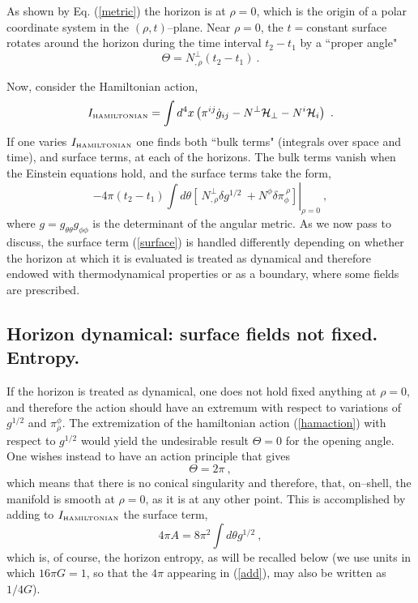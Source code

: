 \documentclass[a4paper,preprintnumbers,amsmath,amssymb]{revtex4}
\begin{document}
As shown by Eq. (\ref{metric}) the horizon is at $\rho=0$, which is the origin
of a polar coordinate system in the $(\rho,t)$--plane. Near $\rho=0$, the $t=$constant surface rotates around the horizon during the time interval $t_2-t_1$ by a
``proper angle"
\begin{equation}
\Theta= N^{\perp}_{,\rho} (t_2-t_1) \ .
\label{angle}
\end{equation}

Now, consider the Hamiltonian action,
\begin{equation}
I_{\mbox{{\tiny HAMILTONIAN}}}=\int d^4 x \left( \pi^{ij}\dot{g}_{ij} - N^{\perp}{\cal H}_{\perp} - N^{i}{\cal
H}_{i} \right) \ .
\label{hamaction}
\end{equation}
If one varies $I_{\mbox{{\tiny HAMILTONIAN}}}$ one finds both ``bulk terms" (integrals over space and time), and surface terms,
at each of the horizons. The bulk terms vanish when the Einstein equations hold, and the surface terms take the form\cite{BTZ},
\begin{equation}
-4\pi(t_2-t_1)\left.\int d\theta\left[ \ N^{\perp}_{,\rho} \delta g^{1/2}
 \ + N^{\phi}\delta\pi_{\phi}^{\ \rho} \right]\right|_{\rho=0} \ ,
\label{surface}
\end{equation}
where $g=g_{\theta\theta}g_{\phi\phi}$ is the determinant of the angular metric.
As we now pass to discuss, the surface term (\ref{surface}) is handled differently depending on whether the horizon at which it is evaluated is treated as dynamical and
therefore endowed with thermodynamical properties or as a boundary, where some fields are prescribed.

\subsection*{Horizon dynamical: surface fields not fixed. Entropy.}

If the horizon is treated as dynamical, one does not hold fixed anything at $\rho=0$, and therefore the action should have an extremum with respect to variations of
$g^{1/2}$ and $\pi^{\phi}_{\rho}$. The extremization of the hamiltonian action (\ref{hamaction}) with respect to $g^{1/2}$ would yield the undesirable result
$\Theta=0$ for the opening angle. One wishes instead to have an action principle that gives
\begin{equation}
\Theta=2\pi \ ,
\label{noconical}
\end{equation}
which means that there is no conical singularity and therefore, that, on--shell,
the manifold is smooth at $\rho=0$, as it is at any other point.
This is accomplished by adding to $I_{\mbox{{\tiny HAMILTONIAN}}}$ the surface term\cite{BTZ},
\begin{equation}
4\pi A = 8\pi^2\int d\theta g^{1/2} \ ,
\label{add}
\end{equation}
which is, of course, the horizon entropy,
 as will be recalled below (we use units in which $16\pi G =1$, so that the $4\pi$ appearing in (\ref{add}), may also be written as $1/4G$).
\end{document}
